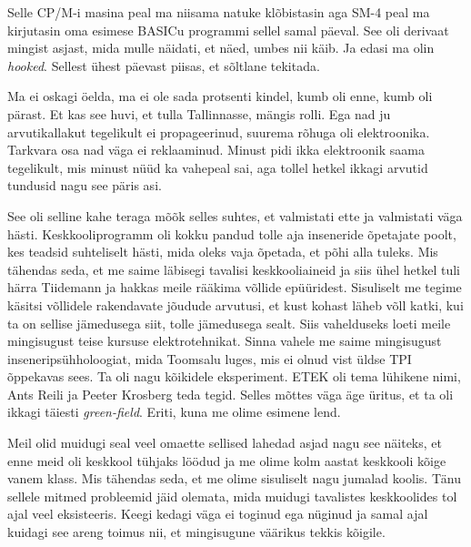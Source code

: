 Selle CP/M-i masina peal ma niisama natuke klõbistasin aga 
SM-4 peal ma 
kirjutasin oma esimese BASICu programmi sellel samal 
päeval. See oli derivaat mingist asjast, mida mulle näidati, et näed, umbes nii 
käib. Ja edasi ma olin \emph{hooked}. Sellest ühest päevast piisas, et sõltlane 
tekitada. 


Ma ei oskagi öelda, ma ei ole sada protsenti kindel, kumb oli enne, kumb oli 
pärast. Et kas see huvi, et tulla Tallinnasse, mängis rolli. Ega nad ju 
arvutikallakut tegelikult ei propageerinud, suurema rõhuga oli  elektroonika. 
Tarkvara osa nad väga ei reklaaminud. Minust pidi ikka elektroonik saama 
tegelikult, mis minust nüüd ka vahepeal sai, aga tollel hetkel ikkagi arvutid 
tundusid nagu see päris asi. 


See oli selline kahe teraga mõõk selles suhtes, et valmistati ette ja 
valmistati väga hästi. Keskkooliprogramm oli kokku pandud 
tolle aja inseneride õpetajate poolt, kes teadsid suhteliselt hästi, mida oleks 
vaja õpetada, et põhi alla tuleks. Mis tähendas seda, et me saime 
läbisegi  tavalisi keskkooliaineid ja siis ühel hetkel tuli härra 
Tiidemann ja hakkas meile rääkima võllide 
epüüridest. Sisuliselt me tegime käsitsi võllidele 
rakendavate jõudude arvutusi, et kust kohast läheb võll katki, kui ta on 
sellise jämedusega siit, tolle jämedusega sealt. Siis vahelduseks loeti meile 
mingisugust teise kursuse elektrotehnikat. Sinna vahele me saime mingisugust 
inseneripsühholoogiat, mida Toomsalu luges, mis ei 
olnud vist üldse TPI õppekavas sees. Ta oli nagu kõikidele eksperiment. 
ETEK  oli tema lühikene nimi, Ants Reili ja 
Peeter Krosberg teda tegid. Selles mõttes 
väga äge üritus, et ta oli ikkagi täiesti \emph{green-field}. Eriti, kuna me 
olime esimene lend. 

Meil olid muidugi seal veel omaette sellised lahedad asjad nagu see näiteks, et 
enne meid oli keskkool tühjaks löödud ja me olime kolm aastat keskkooli kõige 
vanem klass. Mis tähendas seda, et me olime sisuliselt nagu jumalad koolis. 
Tänu sellele mitmed probleemid jäid olemata, mida muidugi tavalistes 
keskkoolides tol ajal veel eksisteeris. Keegi kedagi väga ei toginud ega 
nüginud ja samal ajal kuidagi see areng toimus nii, et mingisugune väärikus 
tekkis kõigile. 

